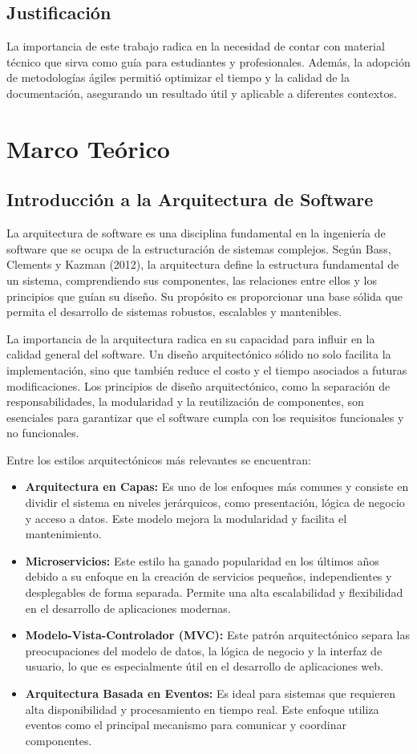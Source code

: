 \documentclass[12pt, a4paper]{article}
\begin{document}
\subsection{Justificación}
La importancia de este trabajo radica en la necesidad de contar con material técnico que sirva como guía para estudiantes y profesionales. Además, la adopción de metodologías ágiles permitió optimizar el tiempo y la calidad de la documentación, asegurando un resultado útil y aplicable a diferentes contextos.

\section{Marco Teórico}

\subsection{Introducción a la Arquitectura de Software}
La arquitectura de software es una disciplina fundamental en la ingeniería de software que se ocupa de la estructuración de sistemas complejos. Según Bass, Clements y Kazman (2012), la arquitectura define la estructura fundamental de un sistema, comprendiendo sus componentes, las relaciones entre ellos y los principios que guían su diseño. Su propósito es proporcionar una base sólida que permita el desarrollo de sistemas robustos, escalables y mantenibles.

La importancia de la arquitectura radica en su capacidad para influir en la calidad general del software. Un diseño arquitectónico sólido no solo facilita la implementación, sino que también reduce el costo y el tiempo asociados a futuras modificaciones. Los principios de diseño arquitectónico, como la separación de responsabilidades, la modularidad y la reutilización de componentes, son esenciales para garantizar que el software cumpla con los requisitos funcionales y no funcionales.

Entre los estilos arquitectónicos más relevantes se encuentran:
\begin{itemize}
    \item \textbf{Arquitectura en Capas:} Es uno de los enfoques más comunes y consiste en dividir el sistema en niveles jerárquicos, como presentación, lógica de negocio y acceso a datos. Este modelo mejora la modularidad y facilita el mantenimiento.
    \item \textbf{Microservicios:} Este estilo ha ganado popularidad en los últimos años debido a su enfoque en la creación de servicios pequeños, independientes y desplegables de forma separada. Permite una alta escalabilidad y flexibilidad en el desarrollo de aplicaciones modernas.
    \item \textbf{Modelo-Vista-Controlador (MVC):} Este patrón arquitectónico separa las preocupaciones del modelo de datos, la lógica de negocio y la interfaz de usuario, lo que es especialmente útil en el desarrollo de aplicaciones web.
    \item \textbf{Arquitectura Basada en Eventos:} Es ideal para sistemas que requieren alta disponibilidad y procesamiento en tiempo real. Este enfoque utiliza eventos como el principal mecanismo para comunicar y coordinar componentes.
\end{itemize}
\end{document}
